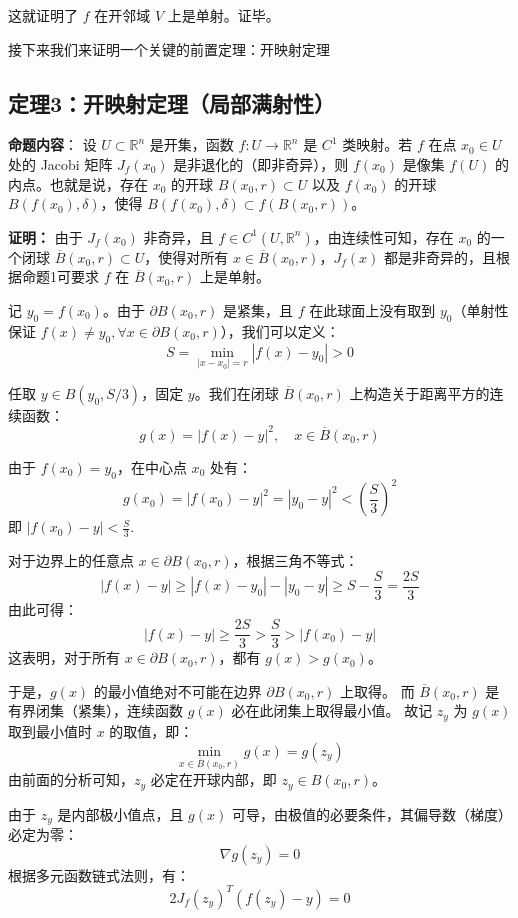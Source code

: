 \documentclass[12pt,a4paper]{ctexart}
\begin{document}
这就证明了 $f$ 在开邻域 $V$ 上是单射。证毕。

接下来我们来证明一个关键的前置定理：开映射定理

\subsection*{定理3：开映射定理（局部满射性）}

\textbf{命题内容}：
设 $U \subset \mathbb{R}^n$ 是开集，函数 $f: U \to \mathbb{R}^n$ 是 $C^1$ 类映射。若 $f$ 在点 $x_0 \in U$ 处的 Jacobi 矩阵 $J_f(x_0)$ 是非退化的（即非奇异），则 $f(x_0)$ 是像集 $f(U)$ 的内点。也就是说，存在 $x_0$ 的开球 $B(x_0, r) \subset U$ 以及 $f(x_0)$ 的开球 $B(f(x_0), \delta)$，使得 $B(f(x_0), \delta) \subset f(B(x_0, r))$。

\textbf{证明：}
由于 $J_f(x_0)$ 非奇异，且 $f \in C^1(U, \mathbb{R}^n)$，由连续性可知，存在 $x_0$ 的一个闭球 $\overline{B}(x_0, r) \subset U$，使得对所有 $x \in \overline{B}(x_0, r)$，$J_f(x)$ 都是非奇异的，且根据命题1可要求 $f$ 在 $\overline{B}(x_0, r)$ 上是单射。

记 $y_0 = f(x_0)$。由于 $\partial B(x_0, r)$ 是紧集，且 $f$ 在此球面上没有取到 $y_0$（单射性保证 $f(x) \neq y_0, \forall x \in \partial B(x_0, r)$），我们可以定义：
\[
S = \min_{|x-x_0|=r} |f(x) - y_0| > 0
\]

任取 $y \in B(y_0, S/3)$，固定 $y$。我们在闭球 $\overline{B}(x_0, r)$ 上构造关于距离平方的连续函数：
\[
g(x) = |f(x) - y|^2, \quad x \in \overline{B}(x_0, r)
\]

由于 $f(x_0) = y_0$，在中心点 $x_0$ 处有：
\[
g(x_0) = |f(x_0) - y|^2 = |y_0 - y|^2 < \left(\frac{S}{3}\right)^2
\]
即 $|f(x_0) - y| < \frac{S}{3}$.

对于边界上的任意点 $x \in \partial B(x_0, r)$，根据三角不等式：
\[
|f(x) - y| \ge |f(x) - y_0| - |y_0 - y| \ge S - \frac{S}{3} = \frac{2S}{3}
\]
由此可得：
\[
|f(x) - y| \ge \frac{2S}{3} > \frac{S}{3} > |f(x_0) - y|
\]
这表明，对于所有 $x \in \partial B(x_0, r)$，都有 $g(x) > g(x_0)$。

于是，$g(x)$ 的最小值绝对不可能在边界 $\partial B(x_0, r)$ 上取得。
而 $\overline{B}(x_0, r)$ 是有界闭集（紧集），连续函数 $g(x)$ 必在此闭集上取得最小值。
故记 $z_y$ 为 $g(x)$ 取到最小值时 $x$ 的取值，即：
\[
\min_{x \in \overline{B}(x_0, r)} g(x) = g(z_y)
\]
由前面的分析可知，$z_y$ 必定在开球内部，即 $z_y \in B(x_0, r)$。

由于 $z_y$ 是内部极小值点，且 $g(x)$ 可导，由极值的必要条件，其偏导数（梯度）必定为零：
\[
\nabla g(z_y) = 0
\]
根据多元函数链式法则，有：
\[
2 J_f(z_y)^T (f(z_y) - y) = 0
\]
\end{document}
